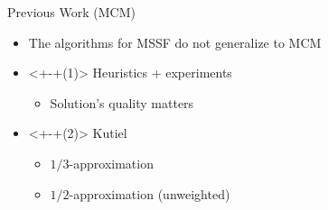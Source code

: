 \begin{frame}{Previous Work (MCM)}
\begin{itemize}[<+>]
	\item The algorithms for MSSF do not generalize to MCM  
	\item<+-+(1)> Heuristics + experiments
  		\begin{itemize}[<+>]
  			\item Solution's quality \alert{matters}
		\end{itemize}
	\item<+-+(2)> Kutiel
	\begin{itemize}
		\item $1/3$-approximation 
		\item $1/2$-approximation (unweighted) 
	\end{itemize}
\end{itemize}
\end{frame}